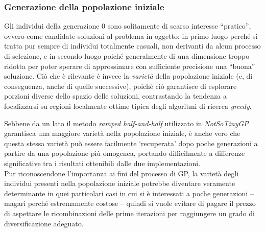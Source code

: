 \documentclass{../llncs}
\begin{document}

\subsubsection{Generazione della popolazione iniziale}
Gli individui della generazione 0 sono solitamente di scarso interesse ``pratico'', ovvero come candidate soluzioni al problema in oggetto: in primo luogo perché si tratta pur sempre di individui totalmente casuali, non derivanti da alcun processo di selezione, e in secondo luogo poiché generalmente di una dimensione troppo ridotta per poter sperare di approssimare con sufficiente precisione una ``buona'' soluzione.
Ciò che è rilevante è invece la \emph{varietà} della popolazione iniziale (e, di conseguenza, anche di quelle successive), poiché ciò garantisce di esplorare porzioni diverse dello spazio delle soluzioni, contrastando la tendenza a focalizzarsi su regioni localmente ottime tipica degli algoritmi di ricerca \emph{greedy}.

Sebbene da un lato il metodo \emph{ramped half-and-half} utilizzato in \emph{NotSoTinyGP} garantisca una maggiore varietà nella popolazione iniziale, è anche vero che questa stessa varietà può essere facilmente `recuperata' dopo poche generazioni a partire da una popolazione più omogenea, portando difficilmente a differenze significative tra i risultati ottenibili dalle due implementazioni.\\

Pur riconoscendone l'importanza ai fini del processo di GP, la varietà degli individui presenti nella popolazione iniziale potrebbe diventare veramente determinante in quei particolari casi in cui si è interessati a poche generazioni -- magari perché estremamente costose -- quindi si vuole evitare di pagare il prezzo di aspettare le ricombinazioni delle prime iterazioni per raggiungere un grado di diversificazione adeguato.
\end{document}
